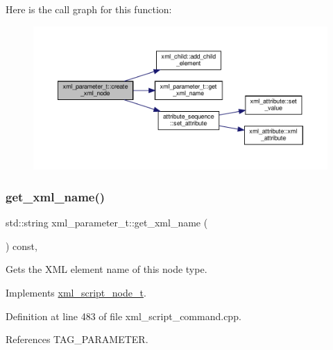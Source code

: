Here is the call graph for this function\+:
\nopagebreak
\begin{figure}[H]
\begin{center}
\leavevmode
\includegraphics[width=350pt]{d4/dfd/classxml__parameter__t_aa08b7e9ca07a2cc859a40a280b31f133_cgraph}
\end{center}
\end{figure}
\mbox{\label{classxml__parameter__t_a22e2fc519a78dbadd7dd583a5e6a5556}} 
\subsubsection{\texorpdfstring{get\+\_\+xml\+\_\+name()}{get\_xml\_name()}}
{\footnotesize\ttfamily std\+::string xml\+\_\+parameter\+\_\+t\+::get\+\_\+xml\+\_\+name (\begin{DoxyParamCaption}{ }\end{DoxyParamCaption}) const\hspace{0.3cm}{\ttfamily [override]}, {\ttfamily [virtual]}}



Gets the X\+ML element name of this node type. 



Implements \hyperlink{classxml__script__node__t_af5815fab8924e5e4f47ba1b7266b6cb8}{xml\+\_\+script\+\_\+node\+\_\+t}.



Definition at line 483 of file xml\+\_\+script\+\_\+command.\+cpp.



References T\+A\+G\+\_\+\+P\+A\+R\+A\+M\+E\+T\+ER.



